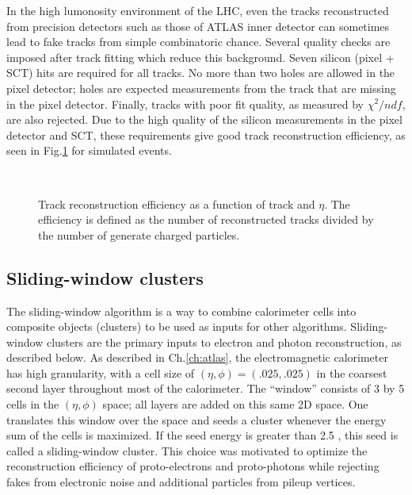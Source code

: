 In the high lumonosity environment of the LHC, even the tracks reconstructed from precision detectors such as those of ATLAS inner detector can sometimes lead to fake tracks from simple combinatoric chance.
Several quality checks are imposed after track fitting which reduce this background.
Seven silicon (pixel + SCT) hits are required for all tracks.
No more than two holes are allowed in the pixel detector; holes are expected measurements from the track that are missing in the pixel detector.
Finally, tracks with poor fit quality, as measured by $\chi^2/ndf$, are also rejected.
Due to the high quality of the silicon measurements in the pixel detector and SCT, these requirements give good track reconstruction efficiency, as seen in Fig.\ref{fig:track_eff} for simulated events\cite{ATL-COM-PHYS-2012-1541}.
\begin{figure}
\caption{Track reconstruction efficiency as a function of track \pt and $\eta$.
The efficiency is defined as the number of reconstructed tracks divided by the number of generate charged particles.} \label{fig:track_eff}
 \\
\end{figure}

\subsection{Sliding-window clusters}\label{sec:sliding_window_cluster}

The sliding-window algorithm is a way to combine calorimeter cells into composite objects (clusters) to be used as inputs for other algorithms\cite{PERF-2013-03}.
Sliding-window clusters are the primary inputs to electron and photon reconstruction, as described below.
As described in Ch.\ref{ch:atlas}, the electromagnetic calorimeter has high granularity, with a cell size of $(\eta, \phi) = (.025, .025)$ in the coarsest second layer throughout most of the calorimeter.
The ``window'' consists of 3 by 5 cells in the $(\eta, \phi)$ space; all layers are added on this same 2D space.
One translates this window over the space and seeds a cluster whenever the energy sum of the cells is maximized.
If the seed energy is greater than 2.5 \GeV, this seed is called a sliding-window cluster.
This choice was motivated to optimize the reconstruction efficiency of proto-electrons and proto-photons while rejecting fakes from electronic noise and additional particles from pileup vertices.

